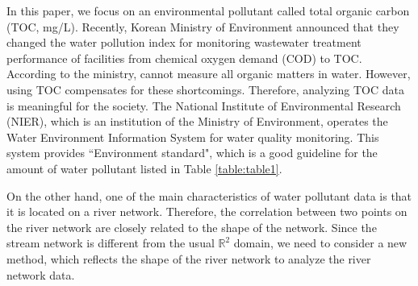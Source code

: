 \documentclass[11pt,titlepage]{article}
\begin{document}
In this paper, we focus on an environmental pollutant called total organic carbon (TOC, mg/L). %
Recently, Korean Ministry of Environment announced that they changed the water pollution index for monitoring wastewater treatment performance of facilities from chemical oxygen demand (COD) to TOC. According to the ministry, cannot measure all organic matters in water. However, using TOC compensates for these shortcomings. Therefore, analyzing TOC data is meaningful for the society.
The National Institute of Environmental Research (NIER), which is an institution of the Ministry of Environment, operates the Water Environment Information System for water quality monitoring. This system provides ``Environment standard", which is a good guideline for the amount of water pollutant listed in Table \ref{table:table1}.

On the other hand, one of the main characteristics of water pollutant data is that it is located on a river network. Therefore, the correlation between two points on the river network are closely related to the shape of the network. Since the stream network is different from the usual $\mathbb{R}^{2}$ domain, we need to consider a new method, which reflects the shape of the river network to analyze the river network data.


\end{document}
